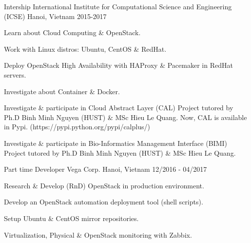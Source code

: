 

\begin{cventries}

  \cventry
    {Intership} %
    {International Institute for Computational Science and Engineering (ICSE)} %
    {Hanoi, Vietnam} %
    {2015-2017} %
    {
      \begin{cvitems} %
        \item {Learn about Cloud Computing \& OpenStack.}
        \item {Work with Linux distros: Ubuntu, CentOS \& RedHat.}
        \item {Deploy OpenStack High Availability with HAProxy \& Pacemaker in RedHat servers.}
        \item {Investigate about Container \& Docker.}
        \item {Investigate \& participate in Cloud Abstract Layer (CAL) Project tutored by Ph.D Binh Minh Nguyen (HUST) \& MSc Hieu Le Quang. Now, CAL is available in Pypi. (https://pypi.python.org/pypi/calplus/)}
        \item {Investigate \& participate in Bio-Informatics Management Interface (BIMI) Project tutored by Ph.D Binh Minh Nguyen (HUST) \& MSc Hieu Le Quang.}
      \end{cvitems}
    }

  \cventry
    {Part time Developer} %
    {Vega Corp.} %
    {Hanoi, Vietnam} %
    {12/2016 - 04/2017} %
    {
      \begin{cvitems} %
        \item {Research \& Develop (RnD) OpenStack in production environment.}
        \item {Develop an OpenStack automation deployment tool (shell scripts).}
        \item {Setup Ubuntu \& CentOS mirror repositories.}
        \item {Virtualization, Physical \& OpenStack monitoring with Zabbix.}
      \end{cvitems}
    }


\end{cventries}

